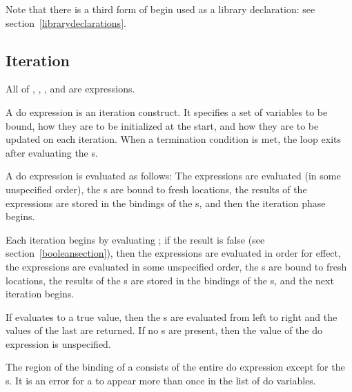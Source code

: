 Note that there is a third form of {\cf begin} used as a library declaration:
see section~\ref{librarydeclarations}.

\subsection{Iteration}%

\noindent%

\syntax
All of , , , and 
are expressions.

\semantics
A {\cf do} expression is an iteration construct.  It specifies a set of variables to
be bound, how they are to be initialized at the start, and how they are
to be updated on each iteration.  When a termination condition is met,
the loop exits after evaluating the s.

A {\cf do} expression is evaluated as follows:
The  expressions are evaluated (in some unspecified order),
the s are bound to fresh locations, the results of the
 expressions are stored in the bindings of the
s, and then the iteration phase begins.

\vest Each iteration begins by evaluating ; if the result is
false (see section~\ref{booleansection}), then the 
expressions are evaluated in order for effect, the 
expressions are evaluated in some unspecified order, the
s are bound to fresh locations, the results of the
s are stored in the bindings of the
s, and the next iteration begins.

\vest If  evaluates to a true value, then the
s are evaluated from left to right and the values of
the last  are returned.  If no s
are present, then the value of the {\cf do} expression is unspecified.

\vest The region of the binding of a 
consists of the entire {\cf do} expression except for the s.
It is an error for a  to appear more than once in the
list of {\cf do} variables.

